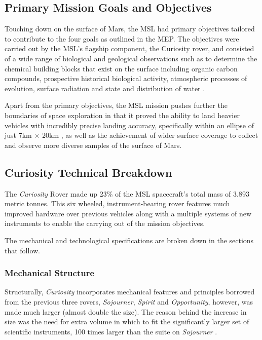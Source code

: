     \subsection{Primary Mission Goals and Objectives}
      Touching down on the surface of Mars, the MSL had primary objectives tailored to contribute to the four goals as outlined in the MEP. The objectives were carried out by the MSL's flagship component, the Curiosity rover, and consisted of a wide range of biological and geological observations such as to determine the chemical building blocks that exist on the surface including organic carbon compounds, prospective historical biological activity, atmospheric processes of evolution, surface radiation and state and distribution of water \cite{mslobjectivesjpl}.
      
      Apart from the primary objectives, the MSL mission pushes further the boundaries of space exploration in that it proved the ability to land heavier vehicles with incredibly precise landing accuracy, specifically within an ellipse of just 7km $\times$ 20km \cite{gwebster_2012}, as well as the achievement of wider surface coverage to collect and observe more diverse samples of the surface of Mars.
              
    \subsection{Curiosity Technical Breakdown}
      The \textit{Curiosity} Rover made up 23\% of the MSL spacecraft's total mass of 3.893 metric tonnes. This six wheeled, instrument-bearing rover features much improved hardware over previous vehicles along with a multiple systems of new instruments to enable the carrying out of the mission objectives.
      
      The mechanical and technological specifications are broken down in the sections that follow.
      
      \subsubsection{Mechanical Structure}
        Structurally, \textit{Curiosity} incorporates mechanical features and principles borrowed from the previous three rovers, \textit{Sojourner}, \textit{Spirit} and \textit{Opportunity}, however, was made much larger (almost double the size). The reason behind the increase in size was the need for extra volume in which to fit the significantly larger set of scientific instruments, 100 times larger than the suite on \textit{Sojourner} \cite{planetary2011}.
        
